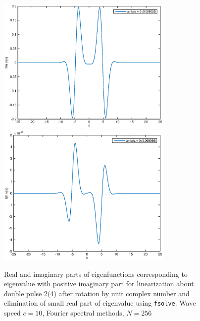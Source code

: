 \documentclass[12pt]{article}
\begin{document}
\begin{figure}[H]
	\includegraphics[width=8.5cm]{four10dp2eigenfnsreal_after}
	\includegraphics[width=8.5cm]{four10dp2eigenfnsimag_after}
	\caption{Real and imaginary parts of eigenfunctions corresponding to eigenvalue with positive imaginary part for linearization about double pulse 2(4) after rotation by unit complex number and elimination of small real part of eigenvalue using \texttt{fsolve}. Wave speed $c = 10$, Fourier spectral methods, $N = 256$}
\end{figure}
\end{document}
